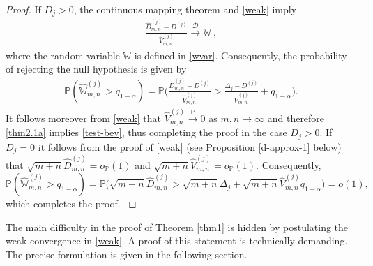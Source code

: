 \documentclass[11pt]{article}
\numberwithin{equation}{section}
\numberwithin{theorem}{section}
\numberwithin{lemma}{section}
\numberwithin{proposition}{section}
\numberwithin{cor}{section}
\numberwithin{definition}{section}
\numberwithin{cons}{section}
\numberwithin{rem}{section}
\numberwithin{exa}{section}
\numberwithin{table}{section}
\numberwithin{figure}{section}
\numberwithin{algo}{section}
\begin{document}
{{\begin{proof}%
If $D_{j} >0$, the continuous mapping theorem and \eqref{weak} imply
 \begin{eqnarray}
\label{thm2.1a}
 \frac{\hat D^{(j)}_{m,n} - D^{(j)}}{\hat V^{(j)}_{m,n}}
   \stackrel{\mathcal{D}}{\longrightarrow}  \mathbb{W}~,
  \end{eqnarray}
  where the random variable $ \mathbb{W}$ is defined in \eqref{wvar}. Consequently,
  the probability of rejecting the null hypothesis is given by
 \begin{eqnarray}
 \label{power}
\mathbb{P} (\hat{\mathbb{W}}^{(j)}_{m,n}  > q_{1 - \alpha} )
= \mathbb{P} \bigg (  \frac{\hat D^{(j)}_{m,n} - D^{(j)}}{\hat V^{(j)}_{m,n}}
 > \frac {\Delta_j - D^{(j)}}{\hat V^{(j)} _{m,n}}+ q_{1 - \alpha} \bigg).
  \end{eqnarray}
It follows moreover from \eqref{weak} that
$\hat V^{(j)}_{m,n} \stackrel {\mathbb{P}}{\rightarrow} 0$ as $m,n \to \infty$ and therefore \eqref{thm2.1a} implies \eqref{test-bev}, %
{
thus completing the proof in the case $D_{j} >0$. If $D_{j} = 0$  it follows from the proof of  \eqref{weak}
(see Proposition \ref{d-approx-1} below) that $\sqrt{m+n} \hat D_{m,n}^{(j)} = o_{ \mathbb{P} }(1)$ and
 $\sqrt{m+n} \hat V_{m,n}^{(j)} = o_{ \mathbb{P} }(1)$. Consequently,
 $$
 \mathbb{P} (\hat{\mathbb{W}}^{(j)}_{m,n}  > q_{1 - \alpha} ) = \mathbb{P} \big  ( \sqrt{m+n} \hat D_{m,n}^{(j)}   > \sqrt{m+n} \Delta_{j} + \sqrt{m+n} \hat V_{m,n}^{(j)} q_{1-\alpha}  \big ) = o(1),
$$
which completes the proof.
}
\end{proof}

The main difficulty in the proof of Theorem \ref{thm1}
is hidden by postulating the weak convergence in \eqref{weak}. A proof of this statement is technically demanding. The precise formulation is given in the following section.

}}
\end{document}
